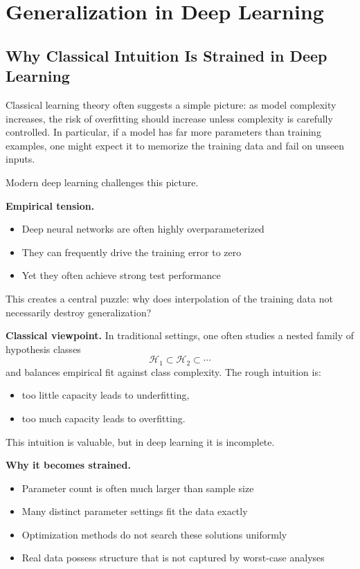 \chapter{Generalization in Deep Learning}

\section{Why Classical Intuition Is Strained in Deep Learning}

Classical learning theory often suggests a simple picture: as model complexity increases, the risk of overfitting should increase unless complexity is carefully controlled. In particular, if a model has far more parameters than training examples, one might expect it to memorize the training data and fail on unseen inputs.

Modern deep learning challenges this picture.

\medskip

\noindent
\textbf{Empirical tension.}
\begin{itemize}
    \item Deep neural networks are often highly overparameterized
    \item They can frequently drive the training error to zero
    \item Yet they often achieve strong test performance
\end{itemize}

\medskip

\noindent
This creates a central puzzle: why does interpolation of the training data not necessarily destroy generalization?

\medskip

\noindent
\textbf{Classical viewpoint.}
In traditional settings, one often studies a nested family of hypothesis classes
\[
\mathcal{H}_1 \subset \mathcal{H}_2 \subset \cdots
\]
and balances empirical fit against class complexity. The rough intuition is:
\begin{itemize}
    \item too little capacity leads to underfitting,
    \item too much capacity leads to overfitting.
\end{itemize}

\medskip

\noindent
This intuition is valuable, but in deep learning it is incomplete.

\medskip

\noindent
\textbf{Why it becomes strained.}
\begin{itemize}
    \item Parameter count is often much larger than sample size
    \item Many distinct parameter settings fit the data exactly
    \item Optimization methods do not search these solutions uniformly
    \item Real data possess structure that is not captured by worst-case analyses
\end{itemize}

